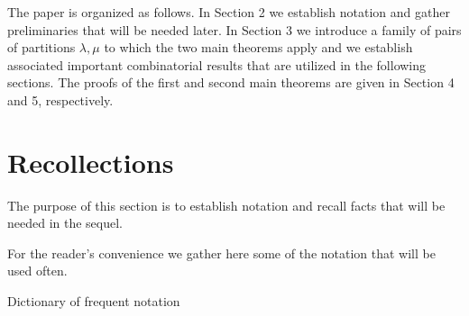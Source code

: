 \documentclass[ALCO,Unicode]{cedram}
\numberwithin{equation}{section}
\begin{document}
The paper is organized as follows. In Section 2 we establish notation and gather preliminaries that will be needed later. In Section 3 we introduce a family of pairs of partitions $\lambda, \mu$ to which the two main theorems apply and we establish associated important combinatorial results that are utilized in the following sections. The proofs of the first and second main theorems are given in Section 4 and 5, respectively.

\section{Recollections}
The purpose of this section is to establish notation and recall facts that will be needed in the sequel.

 For the reader’s convenience we gather here some of the notation that will be used often. 
 \begin{center}
 	Dictionary of frequent notation
 \end{center}
\end{document}
